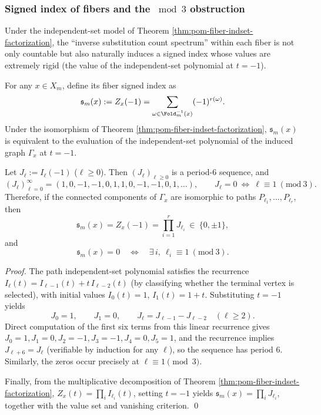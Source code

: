 



\subsubsection{Signed index of fibers and the \texorpdfstring{$\bmod 3$}{mod 3} obstruction}\label{subsec:pom-fiber-signed-index}
Under the independent-set model of Theorem \ref{thm:pom-fiber-indset-factorization}, the ``inverse substitution count spectrum'' within each fiber is not only countable but also naturally induces a signed index whose values are extremely rigid (the value of the independent-set polynomial at \(t=-1\)).

\begin{definition}\label{def:pom-fiber-signed-index}
For any \(x\in X_m\), define its fiber signed index as
\[
\mathfrak{s}_m(x):=Z_x(-1)=\sum_{\omega\in\Fold_m^{-1}(x)}(-1)^{r(\omega)}.
\]
Under the isomorphism of Theorem \ref{thm:pom-fiber-indset-factorization}, \(\mathfrak{s}_m(x)\) is equivalent to the evaluation of the independent-set polynomial of the induced graph \(\Gamma_x\) at \(t=-1\).
\end{definition}

\begin{theorem}\label{thm:pom-fiber-signed-index-periodicity}
Let \(J_\ell:=I_\ell(-1)\) (\(\ell\ge 0\)). Then \((J_\ell)_{\ell\ge 0}\) is a period-\(6\) sequence, and
\[
(J_\ell)_{\ell=0}^{\infty}=(1,0,-1,-1,0,1,1,0,-1,-1,0,1,\dots),
\qquad
J_\ell=0\ \Longleftrightarrow\ \ell\equiv 1\ (\mathrm{mod}\ 3).
\]
Therefore, if the connected components of \(\Gamma_x\) are isomorphic to paths \(P_{\ell_1},\dots,P_{\ell_r}\), then
\[
\mathfrak{s}_m(x)=Z_x(-1)=\prod_{i=1}^r J_{\ell_i}\ \in\ \{0,\pm 1\},
\]
and
\[
\mathfrak{s}_m(x)=0
\quad\Longleftrightarrow\quad
\exists\,i,\ \ell_i\equiv 1\ (\mathrm{mod}\ 3).
\]
\end{theorem}

\begin{proof}
The path independent-set polynomial satisfies the recurrence
\(
I_\ell(t)=I_{\ell-1}(t)+t\,I_{\ell-2}(t)
\)
(by classifying whether the terminal vertex is selected), with initial values \(I_0(t)=1\), \(I_1(t)=1+t\).
Substituting \(t=-1\) yields
\[
J_0=1,\qquad J_1=0,\qquad J_\ell=J_{\ell-1}-J_{\ell-2}\quad(\ell\ge 2).
\]
Direct computation of the first six terms from this linear recurrence gives
\(
J_0=1,J_1=0,J_2=-1,J_3=-1,J_4=0,J_5=1
\), and the recurrence implies \(J_{\ell+6}=J_\ell\) (verifiable by induction for any \(\ell\)), so the sequence has period \(6\).
Similarly, the zeros occur precisely at \(\ell\equiv 1\pmod 3\).
\par
Finally, from the multiplicative decomposition of Theorem \ref{thm:pom-fiber-indset-factorization},
\(
Z_x(t)=\prod_i I_{\ell_i}(t)
\),
setting \(t=-1\) yields \(\mathfrak{s}_m(x)=\prod_i J_{\ell_i}\), together with the value set and vanishing criterion. \qed
\end{proof}

